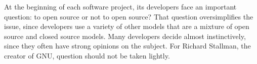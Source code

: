 At the beginning of each software project, its developers face an important
question: to open source or not to open source? That question oversimplifies the
issue, since developers use a variety of other models that are a mixture of
open source and closed source models. Many developers decide almost
instinctively, since they often have strong opinions on the subject. For Richard
Stallman, the creator of GNU, question should not be taken lightly.
